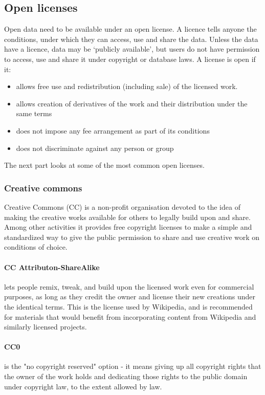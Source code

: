 \documentclass[thesis=B,english]{FITthesis}[2012/06/26]
\begin{document}
	\subsection{Open licenses}
	\label{licenses}
	Open data need to be available under an open license. A licence tells anyone the conditions, under which they can access, use and share the data. Unless the data have a licence, data may be ‘publicly available’, but users do not have permission to access, use and share it under copyright or database laws. A license is open if it:
	\begin{itemize}
		\item allows free use and redistribution (including sale) of the licensed work.
		\item allows creation of derivatives of the work and their distribution under the same terms
		\item does not impose any fee arrangement as part of its conditions
		\item does not discriminate against any person or group
	\end{itemize} 
	The next part looks at some of the most common open licenses. 
	\subsubsection{Creative commons}
	Creative Commons (CC) is a non-profit organisation devoted to the idea of making the creative works available for others to legally build upon and share. Among other activities it provides free copyright licenses to make a simple and standardized way to give the public permission to share and use creative work on conditions of choice. \cite{creativecommons}
	\paragraph{CC Attributon-ShareAlike}
	lets people remix, tweak, and build upon the licensed work even for commercial purposes, as long as they credit the owner and license their new creations under the identical terms. This is the license used by Wikipedia, and is recommended for materials that would benefit from incorporating content from Wikipedia and similarly licensed projects.
	\paragraph{CC0}
	is the "no copyright reserved" option - it means giving up all copyright rights that the owner of the work holds and dedicating those rights to the public domain under copyright law, to the extent allowed by law.
\end{document}
